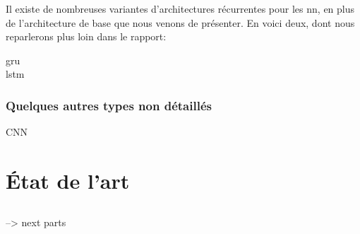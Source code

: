 
Il existe de nombreuses variantes d'architectures récurrentes pour les \gls{nn}, en plus de l'architecture de base que nous venons de présenter.
En voici deux, dont nous reparlerons plus loin dans le rapport:
\begin{description}
	\item[\Gls{gru}\label{def:gru}]
	\item[\Gls{lstm}\label{def:lstm}]
\end{description}
\subsubsection{Quelques autres types non détaillés}
CNN


\section{État de l'art\label{sec:soa}}
\subsection{}
\subsection{}

--> next parts
